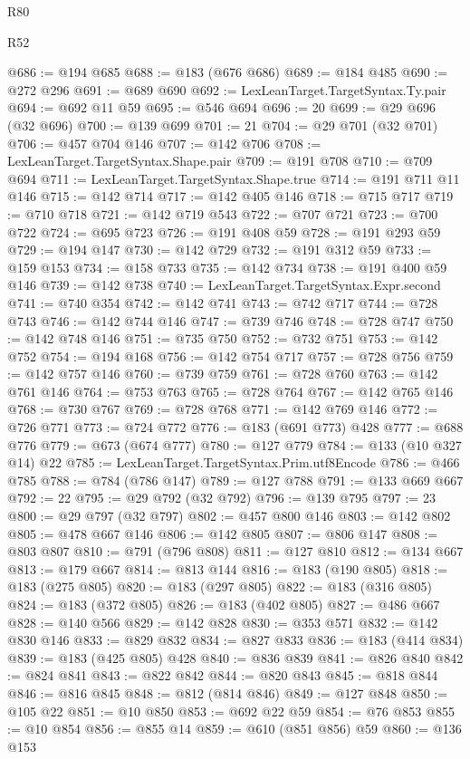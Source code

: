 \begin{lexlean}{R80}
\begin{lexlean}{R52}
\begin{coremodule}
{{{{{{{{{{{{{{{{{{{{{{{{{{{{{{{{{{{{{{{{{{{{{{{{{{{{{{{{{{{{{{{{{{{{{{{{{{{{{{{{{{{{{{{{{{{{{{{{{{{{{{{{{{{{{{{{{{{{{{{{{{{{{{{{{{{{{{{{{{{{{{{{{{{{{{{{{{{{{{{{{{{{{{{{{{{{{{{{{{{{{{{{{{{{{{{{{{{{{{@686 := @194 @685
@688 := @183 (@676 @686)
@689 := @184 @485
@690 := @272 @296
@691 := @689 @690
@692 := LexLeanTarget.TargetSyntax.Ty.pair
@694 := @692 @11 @59
@695 := @546 @694
@696 := 20
@699 := @29 @696 (@32 @696)
@700 := @139 @699
@701 := 21
@704 := @29 @701 (@32 @701)
@706 := @457 @704 @146
@707 := @142 @706
@708 := LexLeanTarget.TargetSyntax.Shape.pair
@709 := @191 @708
@710 := @709 @694
@711 := LexLeanTarget.TargetSyntax.Shape.true
@714 := @191 @711 @11 @146
@715 := @142 @714
@717 := @142 @405 @146
@718 := @715 @717
@719 := @710 @718
@721 := @142 @719 @543
@722 := @707 @721
@723 := @700 @722
@724 := @695 @723
@726 := @191 @408 @59
@728 := @191 @293 @59
@729 := @194 @147
@730 := @142 @729
@732 := @191 @312 @59
@733 := @159 @153
@734 := @158 @733
@735 := @142 @734
@738 := @191 @400 @59 @146
@739 := @142 @738
@740 := LexLeanTarget.TargetSyntax.Expr.second
@741 := @740 @354
@742 := @142 @741
@743 := @742 @717
@744 := @728 @743
@746 := @142 @744 @146
@747 := @739 @746
@748 := @728 @747
@750 := @142 @748 @146
@751 := @735 @750
@752 := @732 @751
@753 := @142 @752
@754 := @194 @168
@756 := @142 @754 @717
@757 := @728 @756
@759 := @142 @757 @146
@760 := @739 @759
@761 := @728 @760
@763 := @142 @761 @146
@764 := @753 @763
@765 := @728 @764
@767 := @142 @765 @146
@768 := @730 @767
@769 := @728 @768
@771 := @142 @769 @146
@772 := @726 @771
@773 := @724 @772
@776 := @183 (@691 @773) @428
@777 := @688 @776
@779 := @673 (@674 @777)
@780 := @127 @779
@784 := @133 (@10 @327 @14) @22
@785 := LexLeanTarget.TargetSyntax.Prim.utf8Encode
@786 := @466 @785
@788 := @784 (@786 @147)
@789 := @127 @788
@791 := @133 @669 @667
@792 := 22
@795 := @29 @792 (@32 @792)
@796 := @139 @795
@797 := 23
@800 := @29 @797 (@32 @797)
@802 := @457 @800 @146
@803 := @142 @802
@805 := @478 @667 @146
@806 := @142 @805
@807 := @806 @147
@808 := @803 @807
@810 := @791 (@796 @808)
@811 := @127 @810
@812 := @134 @667
@813 := @179 @667
@814 := @813 @144
@816 := @183 (@190 @805)
@818 := @183 (@275 @805)
@820 := @183 (@297 @805)
@822 := @183 (@316 @805)
@824 := @183 (@372 @805)
@826 := @183 (@402 @805)
@827 := @486 @667
@828 := @140 @566
@829 := @142 @828
@830 := @353 @571
@832 := @142 @830 @146
@833 := @829 @832
@834 := @827 @833
@836 := @183 (@414 @834)
@839 := @183 (@425 @805) @428
@840 := @836 @839
@841 := @826 @840
@842 := @824 @841
@843 := @822 @842
@844 := @820 @843
@845 := @818 @844
@846 := @816 @845
@848 := @812 (@814 @846)
@849 := @127 @848
@850 := @105 @22
@851 := @10 @850
@853 := @692 @22 @59
@854 := @76 @853
@855 := @10 @854
@856 := @855 @14
@859 := @610 (@851 @856) @59
@860 := @136 @153
}}}}}}}}}}}}}}}}}}}}}}}}}}}}}}}}}}}}}}}}}}}}}}}}}}}}}}}}}}}}}}}}}}}}}}}}}}}}}}}}}}}}}}}}}}}}}}}}}}}}}}}}}}}}}}}}}}}}}}}}}}}}}}}}}}}}}}}}}}}}}}}}}}}}}}}}}}}}}}}}}}}}}}}}}}}}}}}}}}}}}}}}}}}}}}}}}}}}}}
\end{coremodule}
\end{lexlean}
\end{lexlean}
